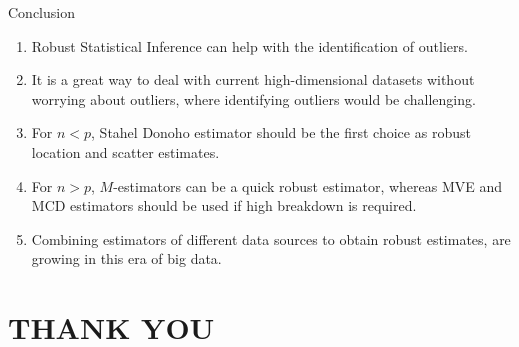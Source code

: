 \documentclass[10pt,xcolor=svgnames]{beamer} %
\begin{document}
\begin{frame}{Conclusion}
    \begin{enumerate}
        \item Robust Statistical Inference can help with the identification of outliers.
        \item It is a great way to deal with current high-dimensional datasets without worrying about outliers, where identifying outliers would be challenging.
        \item For $n < p$, Stahel Donoho estimator should be the first choice as robust location and scatter estimates.
        \item For  $n > p$, $M$-estimators can be a quick robust estimator, whereas MVE and MCD estimators should be used if high breakdown is required.
        \item Combining estimators of different data sources to obtain robust estimates, are growing in this era of big data.  
    \end{enumerate}
\end{frame}


\section*{THANK YOU}
\end{document}

